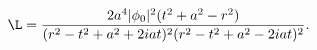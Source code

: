 \begin{equation}
\L = 
{
2 a^4 |\phi_0|^2 (t^2+a^2-r^2)
\over
(r^2-t^2+a^2+2iat)^2(r^2-t^2+a^2-2iat)^2
}.
\end{equation}

